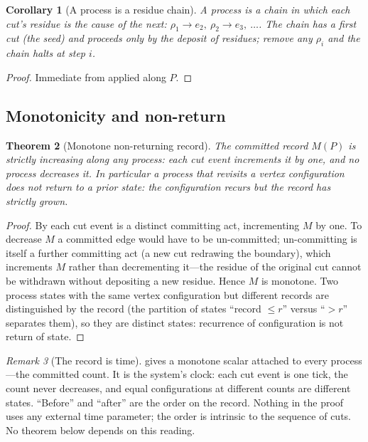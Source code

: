 \documentclass[11pt,a4paper]{article}
\theoremstyle{thmstyle}
\newtheorem{theorem}{Theorem}[section]
\newtheorem{corollary}[theorem]{Corollary}
\theoremstyle{definition}
\theoremstyle{remark}
\newtheorem{remark}[theorem]{Remark}
\newcommand{\rec}{M}                     %
\newcommand{\res}{\rho}                  %
\begin{document}
\begin{corollary}[A process is a residue chain]
\label{cor:chain}
A process is a chain in which each cut's residue is the cause of the next:
$\res_1\to e_2,\ \res_2\to e_3,\ \dots$. The chain has a first cut (the
seed) and proceeds only by the deposit of residues; remove any $\res_i$
and the chain halts at step $i$.
\end{corollary}

\begin{proof}
Immediate from  applied along $P$.
\end{proof}

\subsection{Monotonicity and non-return}

\begin{theorem}[Monotone non-returning record]
\label{thm:monotone}
The committed record $\rec(P)$ is strictly increasing along any process:
each cut event increments it by one, and no process decreases it. In
particular a process that revisits a vertex configuration does not return
to a prior state: the configuration recurs but the record has strictly
grown.
\end{theorem}

\begin{proof}
By  each cut event is a distinct committing act,
incrementing $\rec$ by one. To decrease $\rec$ a committed edge would have
to be un-committed; un-committing is itself a further committing act (a new
cut redrawing the boundary), which increments $\rec$ rather than
decrementing it---the residue of the original cut cannot be withdrawn
without depositing a new residue. Hence $\rec$ is monotone. Two process
states with the same vertex configuration but different records are
distinguished by the record (the partition of states ``record $\le r$''
versus ``$>r$'' separates them), so they are distinct states: recurrence of
configuration is not return of state.
\end{proof}

\begin{remark}[The record is time]
\label{rem:time}
 gives a monotone scalar attached to every process---the
committed count. It is the system's clock: each cut event is one tick, the
count never decreases, and equal configurations at different counts are
different states. ``Before'' and ``after'' are the order on the record.
Nothing in the proof uses any external time parameter; the order is
intrinsic to the sequence of cuts. No theorem below depends on this
reading.
\end{remark}
\end{document}
